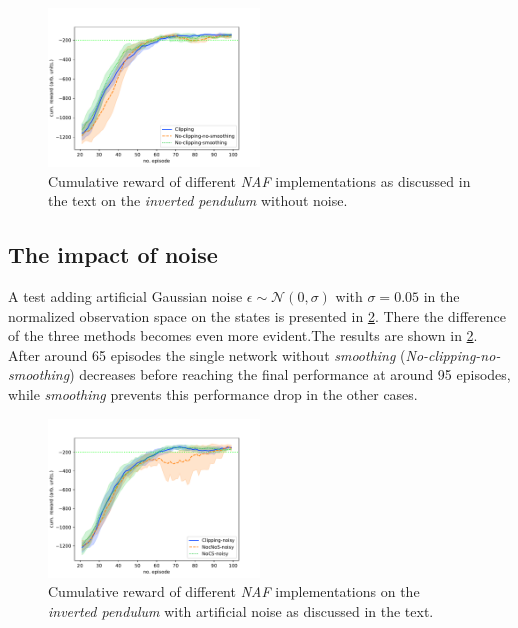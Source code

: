 \documentclass[
reprint,
amsmath,amssymb,amsfonts,clevref,
aps,
prstab,
]{revtex4-2}
\begin{document}
	\begin{figure}[!h]
	\centering
	\includegraphics*[width=0.5\textwidth]{Figures/Comparison_naf}
	\caption{Cumulative reward of different \emph{NAF} implementations as discussed in the text on the \emph{inverted pendulum} without noise.}
	\label{fig:comparsion_smoothing_small}
\end{figure}





	\subsection{The impact of noise}\label{appendix:The impact of noise}
	A test adding artificial Gaussian noise $\epsilon \sim \mathcal{N}(0, \sigma)$ with $\sigma=0.05$ in the normalized observation space on the states is presented in \cref{fig:comparsion_noise}. There the difference of the three methods becomes even more evident.The results are shown in \cref{fig:comparsion_noise}. After around 65 episodes the single network without \emph{smoothing} (\emph{No-clipping-no-smoothing}) decreases before reaching the final performance at around 95 episodes, while  \emph{smoothing} prevents this performance drop in the other cases. 
	\begin{figure}[!h]
		\centering
		\includegraphics*[width=0.5\textwidth]{Figures/Comparison_noise}
		\caption{Cumulative reward of different \emph{NAF} implementations on the \emph{inverted pendulum} with artificial noise as discussed in the text.}
		\label{fig:comparsion_noise}
	\end{figure}
\end{document}
